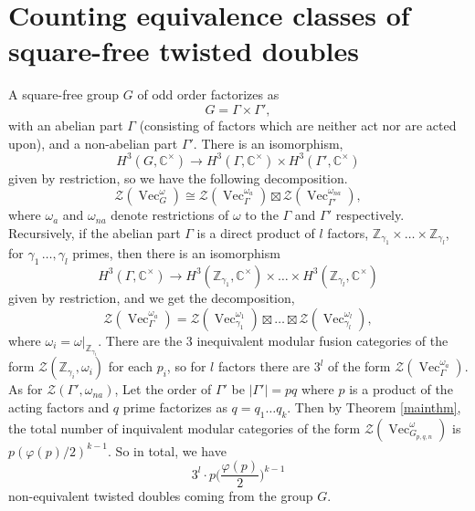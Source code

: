 \documentclass[a4paper, 10pt]{book}
\theoremstyle{definition}
\numberwithin{equation}{chapter}
\newcommand\Vect{\operatorname{Vec}}
\newcommand\CC{\mathbb C}
\newcommand\ZZ{\mathbb Z}
\newcommand\CTR{\mathcal Z}
\begin{document}
\section{Counting equivalence classes of square-free twisted doubles}
A square-free group $G$ of odd order factorizes as \begin{equation*}
	G= \Gamma \times \Gamma',
\end{equation*} with an abelian part $\Gamma$ (consisting of factors which are neither act nor are acted upon), and a non-abelian part $\Gamma'$. There is an isomorphism,
\begin{equation*}
	H^3(G, \CC^\times) \rightarrow H^3(\Gamma, \CC^\times) \times H^3(\Gamma', \CC^\times)
\end{equation*} given by restriction, so we have the following decomposition.
\begin{equation*}
	\CTR(\Vect^\omega_G) \cong \CTR(\Vect_\Gamma^{\omega_a}) \boxtimes  \CTR(\Vect_{\Gamma'}^{\omega_{na}}),
\end{equation*} where $\omega_a$ and $\omega_{na}$ denote restrictions of $\omega$ to the $\Gamma$ and $\Gamma'$ respectively.  Recursively, if the abelian part $\Gamma$ is a direct product of $l$ factors, $\ZZ_{\gamma_1}\times\dots\times \ZZ_{\gamma_l}$, for $\gamma_1\, \dots, \gamma_l$ primes, then there is an isomorphism \begin{equation*}
	H^3(\Gamma, \CC^\times) \rightarrow H^3(\ZZ_{\gamma_1}, \CC^\times) \times \dots \times H^3(\ZZ_{\gamma_l}, \CC^\times)
\end{equation*} given by restriction, and we get the decomposition, \begin{equation*}
	\CTR(\Vect^{\omega_a}_\Gamma) = \CTR(\Vect_{\gamma_1}^{\omega_1}) \boxtimes \dots \boxtimes \CTR(\Vect_{\gamma_l}^{\omega_l}),
\end{equation*}
where $\omega_i = \omega|_{\ZZ_{\gamma_i}}$.
There are the 3 inequivalent modular fusion categories of the form $\CTR(\ZZ_{\gamma_i}, \omega_i)$ for each $p_i$, so for $l$ factors there are $3^l$ of the form 
$\CTR(\Vect^{\omega_a}_\Gamma)$.
As for $\CTR(\Gamma', \omega_{na})$, Let the order of $\Gamma'$ be 
	$|\Gamma'| = pq$
 where $p$ is a product of the acting factors and $q$ prime factorizes as $q= q_1 \dots q_k$. Then by Theorem \ref{mainthm}, the total number of inquivalent modular categories of the form $\CTR(\Vect^\omega_{G_{p,q,n}})$ is $
 	p(\varphi(p)/2)^{k-1}.
 $
So in total, we have \begin{equation*}
	3^l \cdot p\bigg(\frac{\varphi(p)}2\bigg)^{k-1}
\end{equation*} non-equivalent twisted doubles coming from the group $G$.
\end{document}
